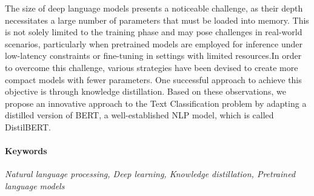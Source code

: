 The size of deep language models presents a noticeable challenge, as their depth necessitates a large number of parameters that must be loaded into memory. This is not solely limited to the training phase and may pose challenges in real-world scenarios, particularly when pretrained models are employed for inference under low-latency constraints or fine-tuning in settings with limited resources.In order to overcome this challenge, various strategies have been devised to create more compact models with fewer parameters. One successful approach to achieve this objective is through knowledge distillation. Based on these observations, we propose an innovative approach to the Text Classification problem by adapting a distilled version of BERT\cite{DevlinCLT19}, a well-established NLP model, which is called DistilBERT\cite{Sanh2019}.


\paragraph{Keywords}
\textit{Natural language processing, Deep learning, Knowledge distillation, Pretrained language models}